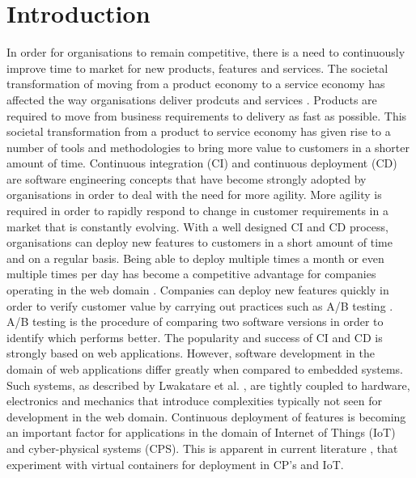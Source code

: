 \iffalse  \fi
%
\chapter{Introduction}
In order for organisations to remain competitive, there is a need to continuously improve time to market for new products, features and services. The societal transformation of moving from a product economy to a service economy has affected the way organisations deliver prodcuts and services \cite{mckinsey}. Products are required to move from business requirements to delivery as fast as possible. This societal transformation from a product to service economy has given rise to a number of tools and methodologies to bring more value to customers in a shorter amount of time. Continuous integration (CI) and continuous deployment (CD) are software engineering concepts that have become strongly adopted by organisations in order to deal with the need for more agility. More agility is required in order to rapidly respond to change in customer requirements in a market that is constantly evolving. With a well designed CI and CD process, organisations can deploy new features to customers in a short amount of time and on a regular basis. Being able to deploy multiple times a month or even multiple times per day has become a competitive advantage for companies operating in the web domain \cite{facebook}. Companies can deploy new features quickly in order to verify customer value by carrying out practices such as A/B testing \cite{abtest}. A/B testing is the procedure of comparing two software versions in order to identify which performs better. The popularity and success of CI and CD is strongly based on web applications. However, software development in the domain of web applications differ greatly when compared to embedded systems. Such systems, as described by Lwakatare et al. \cite{7427859}, are tightly coupled to hardware, electronics and mechanics that introduce complexities typically not seen for development in the web domain. Continuous deployment of features is becoming an important factor for applications in the domain of Internet of Things (IoT) and cyber-physical systems (CPS). This is apparent in current literature \cite{gonz,cberger,2iot}, that experiment with virtual containers for deployment in CP's and IoT. \\

